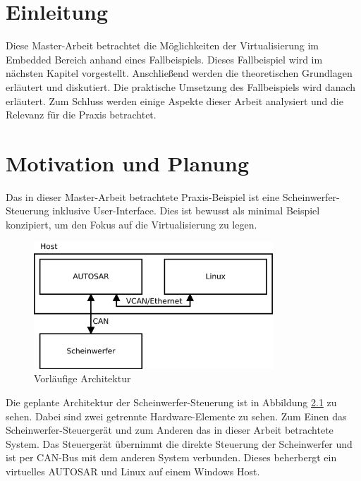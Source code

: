\documentclass[
  a4paper,					    %
  twoside,
  DIV=calc,     				%
  bibliography=totoc,
  cleardoublepage=empty,
  ngerman,     					%
  final       					%
]{scrbook}
\begin{document}
\mainmatter
\chapter{Einleitung}
\label{sec:Einleitung}
Diese Master-Arbeit betrachtet die Möglichkeiten der Virtualisierung im Embedded Bereich anhand eines Fallbeispiels. Dieses Fallbeispiel wird im nächsten Kapitel vorgestellt. Anschließend werden die theoretischen Grundlagen erläutert und diskutiert. Die praktische Umsetzung des Fallbeispiels wird danach erläutert. Zum Schluss werden einige Aspekte dieser Arbeit analysiert und die Relevanz für die Praxis betrachtet.





\chapter{Motivation und Planung}
\label{sec:MotivationPlanung}
Das in dieser Master-Arbeit betrachtete Praxis-Beispiel ist eine Scheinwerfer-Steuerung inklusive User-Interface. Dies ist bewusst als minimal Beispiel konzipiert, um den Fokus auf die Virtualisierung zu legen.

\begin{figure}[ht]
\centering
\includegraphics[width=0.8\textwidth]{arch_begin.png}
\caption{Vorläufige Architektur}
\label{fig:arch_begin}
\end{figure}

Die geplante Architektur der Scheinwerfer-Steuerung ist in Abbildung \ref{fig:arch_begin} zu sehen. Dabei sind zwei getrennte Hardware-Elemente zu sehen. Zum Einen das Scheinwerfer-Steuergerät und zum Anderen das in dieser Arbeit betrachtete System. Das Steuergerät übernimmt die direkte Steuerung der Scheinwerfer und ist per CAN-Bus mit dem anderen System verbunden.  Dieses beherbergt ein virtuelles AUTOSAR und Linux auf einem Windows Host.
\end{document}
